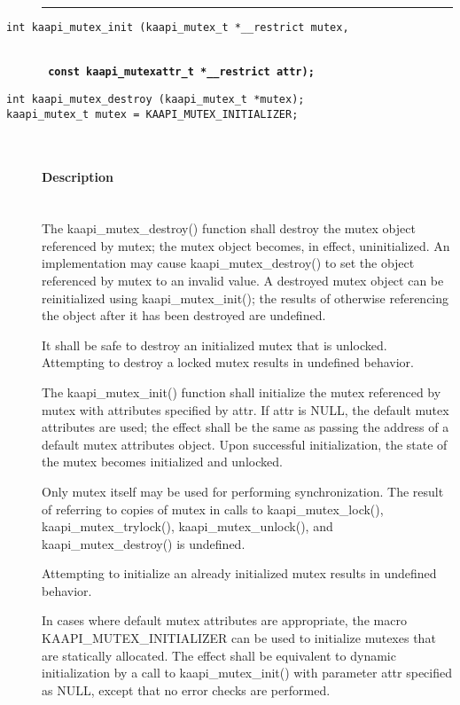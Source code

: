 \begin{description}
\vspace*{3ex} \hrule width 4cm
\vspace*{3ex} 
\item [\texttt{int kaapi\_mutex\_init (kaapi\_mutex\_t *\_\_restrict mutex,}]~\\
\textbf{\texttt{ const kaapi\_mutexattr\_t *\_\_restrict attr);}}
\item [\texttt{int kaapi\_mutex\_destroy (kaapi\_mutex\_t *mutex);}]
\item [\texttt{kaapi\_mutex\_t mutex = KAAPI\_MUTEX\_INITIALIZER;}]~\\


\paragraph{Description}~\\
The kaapi\_mutex\_destroy() function shall destroy the mutex object referenced
by mutex; the mutex object becomes, in effect, uninitialized. An
implementation may cause kaapi\_mutex\_destroy() to set the object referenced
by mutex to an invalid value. A destroyed mutex object can be reinitialized
using kaapi\_mutex\_init(); the results of otherwise referencing the object
after it has been destroyed are undefined.

It shall be safe to destroy an initialized mutex that is unlocked. Attempting
to destroy a locked mutex results in undefined behavior.

The kaapi\_mutex\_init() function shall initialize the mutex referenced by
mutex with attributes specified by attr. If attr is NULL, the default mutex
attributes are used; the effect shall be the same as passing the address of a
default mutex attributes object. Upon successful initialization, the state of
the mutex becomes initialized and unlocked.

Only mutex itself may be used for performing synchronization. The result of
referring to copies of mutex in calls to kaapi\_mutex\_lock(),
kaapi\_mutex\_trylock(), kaapi\_mutex\_unlock(), and kaapi\_mutex\_destroy()
is undefined.

Attempting to initialize an already initialized mutex results in undefined
behavior.

In cases where default mutex attributes are appropriate, the macro
KAAPI\_MUTEX\_INITIALIZER can be used to initialize mutexes that are
statically allocated. The effect shall be equivalent to dynamic initialization
by a call to kaapi\_mutex\_init() with parameter attr specified as NULL,
except that no error checks are performed.


\end{description}

